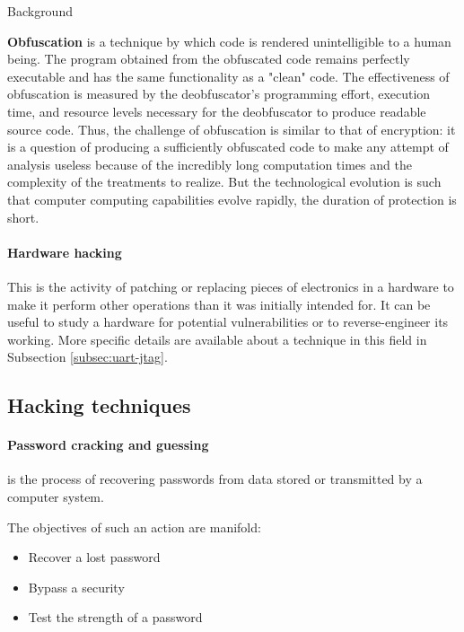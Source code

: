 \begin{chaptercover}{Background}
\begin{indentbox}{1cm}
\textbf{Obfuscation} is a technique by which code is rendered unintelligible to a human being. The program obtained from the obfuscated code remains perfectly executable and has the same functionality as a "clean" code.  The effectiveness of obfuscation is measured by the deobfuscator's programming effort, execution time, and resource levels necessary for the deobfuscator to produce readable source code. Thus, the challenge of obfuscation is similar to that of encryption: it is a question of producing a sufficiently obfuscated code to make any attempt of analysis useless because of the incredibly long computation times and the complexity of the treatments to realize. But the technological evolution is such that computer computing capabilities evolve rapidly, the duration of protection is short.
\end{indentbox}

\paragraph{Hardware hacking} This is the activity of patching or replacing pieces of electronics in a hardware to make it perform other operations than it was initially intended for. It can be useful to study a hardware for potential vulnerabilities or to reverse-engineer its working. More specific details are available about a technique in this field in Subsection \ref{subsec:uart-jtag}.


\subsection{Hacking techniques}\label{subsec:hacking-techniques}

\paragraph{Password cracking and guessing} is the process of recovering passwords from data stored or transmitted by a computer system.

\begin{indentbox}{1cm}
The objectives of such an action are manifold:
\begin{itemize}
  \item Recover a lost password
  \item Bypass a security
  \item Test the strength of a password
\end{itemize}


\end{indentbox}
\end{chaptercover}
